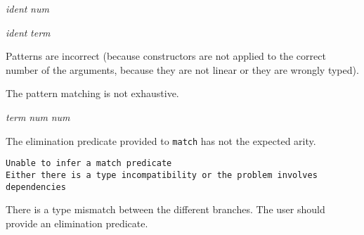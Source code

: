 \begin{ErrMsgs}
\item {} {\sl
    ident}  {\sl num} 

  {\sl ident}  {\sl term}

  {\term}
  {\term} 

 Patterns are incorrect (because constructors are not applied to
  the correct number of the arguments, because they are not linear or
  they are wrongly typed).

\item {}

The pattern matching is not exhaustive.

\item {} {\sl term}  {\sl num}  {\sl
    num} 

The elimination predicate provided to \texttt{match} has not the
  expected arity.





\item {\tt Unable to infer a match predicate\\
    Either there is a type incompatibility or the problem involves\\
    dependencies}

  There is a type mismatch between the different branches.
  The user should provide an elimination predicate.


\end{ErrMsgs}
